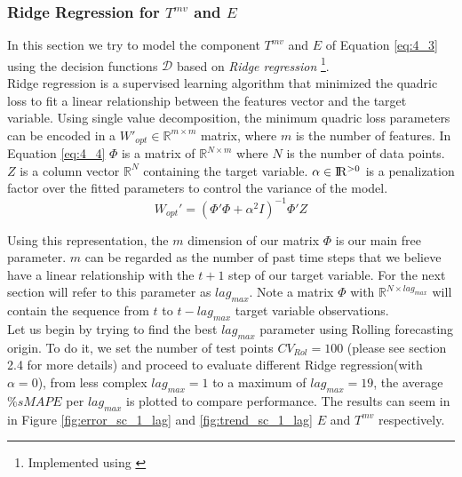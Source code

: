 \subsubsection{Ridge Regression for $T^{mv}$ and $E$}


In this section we try to model the component $T^{mv}$ and $E$ of Equation \ref{eq:4_3} using the decision functions $\mathcal{D}$ based on \emph{Ridge regression} \footnote{Implemented using \cite{scikitlearn22}}.\\

Ridge regression is a supervised learning algorithm that minimized the quadric loss to fit a linear relationship between the features vector and the target variable. Using single value decomposition, the minimum quadric loss parameters can be encoded in a $W'_{opt} \in \mathbb{R}^{m \times m}$ matrix, where $m$ is the number of features. In Equation \ref{eq:4_4} $\Phi$ is a matrix of $\mathbb{R}^{N \times m}$ where $N$ is the number of data points. $Z$ is a column vector $\mathbb{R}^{N}$ containing the target variable. $\alpha \in {\rm I\!R^{>0}}$ is a penalization factor over the fitted parameters to control the variance of the model.\\


\begin{equation}
W_{opt}'=(\Phi'\Phi+\alpha^2I)^{-1}\Phi'Z
\label{eq:4_4}
\end{equation}

Using this representation, the $m$ dimension of our matrix $\Phi$ is our main free parameter. $m$ can be regarded as the number of past time steps that we believe have a linear relationship with the $t+1$ step of our target variable. For the next section will refer to this parameter as $lag_{max}$. Note a matrix $\Phi$ with $\mathbb{R}^{N \times lag_{max}}$ will contain the sequence from $t$ to $t-lag_{max}$ target variable observations.\\ 

Let us begin by trying to find the best $lag_{max}$ parameter using Rolling forecasting origin. To do it, we set the number of test points $CV_{Rol}=100$ (please see section 2.4 for more details) and proceed to evaluate different Ridge regression(with $\alpha=0$), from less complex $lag_{max}=1$ to  a maximum of $lag_{max}=19$, the average $\%sMAPE$ per $lag_{max}$ is plotted to compare performance. The results can seem in in Figure \ref{fig:error_sc_1_lag} and \ref{fig:trend_sc_1_lag} $E$ and $T^{mv}$ respectively.\\ 


